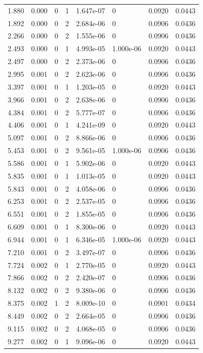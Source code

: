 \documentclass[preview]{standalone}
\begin{document}
{{\begin{tabular}{L{1.2cm}C{1.2cm} C{0.3cm}C{0.5cm} C{1.4cm}C{1.4cm} C{1.4cm}C{1.4cm}}
  1.880  &  0.000  & 0     &  1 &  1.647e-07  & 0  & 0.0920 &  0.0443   \\ 
  1.892  &  0.000  & 0     &  2 &  2.684e-06  & 0  & 0.0906 &  0.0436   \\ 
  2.266  &  0.000  & 0     &  2 &  1.555e-06  & 0  & 0.0906 &  0.0436   \\ 
  2.493  &  0.000  & 0     &  1 &  4.993e-05  & 1.000e-06  & 0.0920 &  0.0443   \\ 
  2.497  &  0.000  & 0     &  2 &  2.373e-06  & 0  & 0.0906 &  0.0436   \\ 
  2.995  &  0.001  & 0     &  2 &  2.623e-06  & 0  & 0.0906 &  0.0436   \\ 
  3.397  &  0.001  & 0     &  1 &  1.203e-05  & 0  & 0.0920 &  0.0443   \\ 
  3.966  &  0.001  & 0     &  2 &  2.638e-06  & 0  & 0.0906 &  0.0436   \\ 
  4.384  &  0.001  & 0     &  2 &  5.777e-07  & 0  & 0.0906 &  0.0436   \\ 
  4.406  &  0.001  & 0     &  1 &  4.241e-09  & 0  & 0.0920 &  0.0443   \\ 
  5.097  &  0.001  & 0     &  2 &  8.866e-06  & 0  & 0.0906 &  0.0436   \\ 
  5.453  &  0.001  & 0     &  2 &  9.561e-05  & 1.000e-06  & 0.0906 &  0.0436   \\ 
  5.586  &  0.001  & 0     &  1 &  5.902e-06  & 0  & 0.0920 &  0.0443   \\ 
  5.835  &  0.001  & 0     &  1 &  1.013e-05  & 0  & 0.0920 &  0.0443   \\ 
  5.843  &  0.001  & 0     &  2 &  4.058e-06  & 0  & 0.0906 &  0.0436   \\ 
  6.253  &  0.001  & 0     &  2 &  2.537e-05  & 0  & 0.0906 &  0.0436   \\ 
  6.551  &  0.001  & 0     &  2 &  1.855e-05  & 0  & 0.0906 &  0.0436   \\ 
  6.609  &  0.001  & 0     &  1 &  8.300e-06  & 0  & 0.0920 &  0.0443   \\ 
  6.944  &  0.001  & 0     &  1 &  6.346e-05  & 1.000e-06  & 0.0920 &  0.0443   \\ 
  7.210  &  0.001  & 0     &  2 &  3.497e-07  & 0  & 0.0906 &  0.0436   \\ 
  7.724  &  0.002  & 0     &  1 &  2.770e-05  & 0  & 0.0920 &  0.0443   \\ 
  7.866  &  0.002  & 0     &  2 &  2.420e-07  & 0  & 0.0906 &  0.0436   \\ 
  8.132  &  0.002  & 0     &  2 &  9.380e-06  & 0  & 0.0906 &  0.0436   \\ 
  8.375  &  0.002  & 1     &  2 &  8.009e-10  & 0  & 0.0901 &  0.0434   \\ 
  8.449  &  0.002  & 0     &  2 &  2.664e-05  & 0  & 0.0906 &  0.0436   \\ 
  9.115  &  0.002  & 0     &  2 &  4.068e-05  & 0  & 0.0906 &  0.0436   \\ 
  9.277  &  0.002  & 0     &  1 &  9.096e-06  & 0  & 0.0920 &  0.0443   \\ 
\hline 
\end{tabular} 

}}
\end{document}
